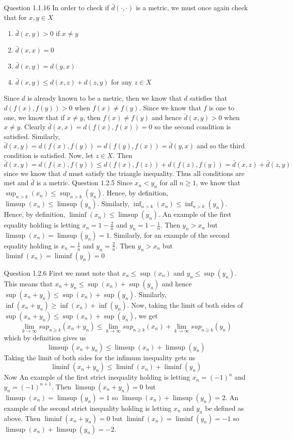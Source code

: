 \documentclass[12pt]{exam}
\begin{document}
\begin{questions}
\question Question 1.1.16\newline
In order to check if $\bar{d}(\cdot, \cdot)$ is a metric, we must once again check that for $x,y \in X$ \begin{enumerate}
    \item $\bar{d}(x,y) > 0$ if $x \neq y$ 
    \item $\bar{d}(x,x) = 0$
    \item $\bar{d}(x,y) = d(y,x)$
    \item $\bar{d}(x,y) \leq d(x,z) + d(z,y)$ for any $z\in X$
\end{enumerate}
Since $d$ is already known to be a metric, then we know that $d$ satisfies that $d(f(x), f(y))> 0$ when $f(x) \neq f(y)$. Since we know that $f$ is one to one, we know that if $x \neq y$, then $f(x) \neq f(y)$ and hence $\bar{d}(x,y) > 0$ when $x\neq y$. Clearly $\bar{d}(x,x) = d(f(x),f(x)) = 0$ so the second condition is satisfied. Similarly,   $\bar{d}(x,y) = d(f(x),f(y)) = d(f(y),f(x)) = \bar{d}(y,x)$ and so the third condition is satisfied. Now, let $z\in X$. Then $\bar{d}(x,y) = d(f(x),f(y)) \leq d(f(x),f(z)) + d(f(z),f(y)) = \bar{d}(x,z) +\bar{d}(z,y)$ since we know that $d$ must satisfy the triangle inequality. Thus all conditions are met and $\bar{d}$ is a metric. 
\question Question 1.2.5\newline
Since $x_n < y_n$ for all $n\geq 1$, we know that $\sup_{n > k}(x_n) \leq \sup_{n > k}(y_n)$. Hence, by definition, $\limsup(x_n) \leq \limsup(y_n)$. Similarly,  $\inf_{n > k}(x_n) \leq \inf_{n > k}(y_n)$. Hence, by definition, $\liminf(x_n) \leq \limsup(y_n)$. \newline  An example of the first equality holding is letting $x_n = 1-\frac{2}{n}$ and $y_n = 1-\frac{1}{n}$. Then $y_n > x_n$ but $\limsup(x_n) = \limsup(y_n) = 1$. Similarly, for an example of the second equality holding is $x_n =\frac{1}{n}$ and $y_n = \frac{2}{n}$. Then $y_n > x_n$ but $\liminf(x_n) = \liminf(y_n) = 0$

\question Question 1.2.6 \newline
First we must note that $x_n \leq \sup(x_n)$ and $y_n\leq \sup(y_n)$. This means that $x_n + y_n \leq \sup(x_n)+\sup(y_n)$ and hence $\sup(x_n + y_n) \leq \sup(x_n)+\sup(y_n)$. Similarly,  $\inf(x_n + y_n) \geq \inf(x_n)+\inf(y_n)$. Now, taking the limit of both sides of $\sup(x_n + y_n) \leq \sup(x_n)+\sup(y_n)$, we get \[\lim_{k\rightarrow \infty}sup_{n\geq k}(x_n + y_n) \leq \lim_{k\rightarrow \infty}sup_{n\geq k}(x_n)+\lim_{k\rightarrow \infty}sup_{n\geq k}(y_n)\] which by definition gives us \[\limsup(x_n + y_n) \leq \limsup(x_n)+\limsup(y_n)\] Taking the limit of both sides for the infimum inequality gets us \[\liminf(x_n + y_n) \leq \liminf(x_n)+\liminf(y_n)\] Now An example of the first strict inequality holding is letting $x_n = (-1)^n$ and $y_n = (-1)^{n+1}$. Then $\limsup(x_n+y_n) = 0$ but $\limsup(x_n) = \limsup(y_n) = 1$ so $\limsup(x_n) +\limsup(y_n) = 2$. An example of the second strict inequality holding is letting $x_n$ and $y_n$ be defined as above. Then $\liminf(x_n+y_n) = 0$ but $\liminf(x_n) = \liminf(y_n) = -1$ so $\limsup(x_n) +\limsup(y_n) = -2$.


\end{questions}
\end{document}
